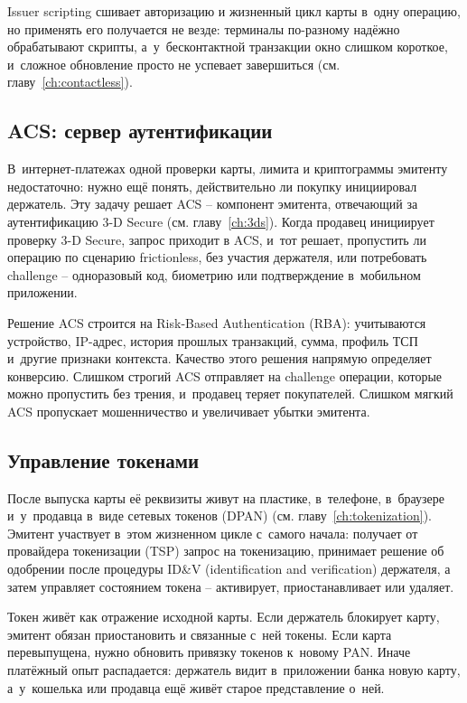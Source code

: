 Issuer scripting сшивает авторизацию и жизненный цикл карты в~одну
операцию, но применять его получается не везде: терминалы по-разному
надёжно обрабатывают скрипты, а~у~бесконтактной транзакции окно
слишком короткое, и~сложное обновление просто не успевает
завершиться (см. главу~\ref{ch:contactless}).

\subsection*{ACS: сервер аутентификации}

В~интернет-платежах одной проверки карты, лимита и криптограммы
эмитенту недостаточно: нужно ещё понять, действительно ли покупку
инициировал держатель. Эту задачу решает ACS -- компонент эмитента,
отвечающий за аутентификацию 3-D Secure (см. главу~\ref{ch:3ds}).
Когда продавец инициирует проверку 3-D Secure, запрос приходит в
ACS, и~тот решает, пропустить ли операцию по сценарию frictionless,
без участия держателя, или потребовать challenge -- одноразовый
код, биометрию или подтверждение в~мобильном
приложении.~\cite{emvco-3ds,emvco-3ds-whitepaper}

Решение ACS строится на Risk-Based Authentication (RBA): учитываются
устройство, IP-адрес, история прошлых транзакций, сумма, профиль ТСП
и~другие признаки контекста. Качество этого решения напрямую
определяет конверсию. Слишком строгий ACS отправляет на challenge
операции, которые можно пропустить без трения, и~продавец теряет
покупателей. Слишком мягкий ACS пропускает мошенничество и
увеличивает убытки эмитента.~\cite{emvco-3ds-whitepaper}

\subsection*{Управление токенами}

После выпуска карты её реквизиты живут на пластике, в~телефоне,
в~браузере и~у~продавца в~виде сетевых токенов (DPAN)
(см. главу~\ref{ch:tokenization}). Эмитент участвует в~этом
жизненном цикле с~самого начала: получает от провайдера токенизации
(TSP) запрос на токенизацию, принимает решение об одобрении после
процедуры ID\&V (identification and verification) держателя, а
затем управляет состоянием токена -- активирует, приостанавливает
или удаляет.~\cite{emvco-payment-tokenisation,visa-vts,nspk-tsp}

Токен живёт как отражение исходной карты. Если держатель блокирует
карту, эмитент обязан приостановить и связанные с~ней токены. Если
карта перевыпущена, нужно обновить привязку токенов к~новому PAN.
Иначе платёжный опыт распадается: держатель видит в~приложении
банка новую карту, а~у~кошелька или продавца ещё живёт старое
представление о~ней.~\cite{emvco-payment-tokenisation,visa-vts}

